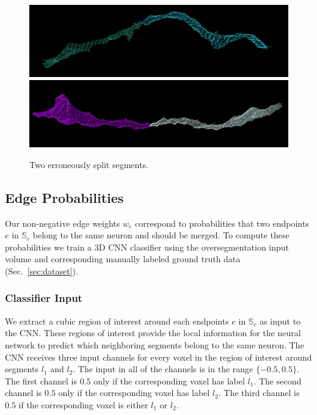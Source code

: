 \begin{figure}[t]
	\centering
	\includegraphics[width=0.92\linewidth]{./figures/split_error1.png}
	\includegraphics[width=0.92\linewidth]{./figures/split_error2.png}
	\caption{Two erroneously split segments. }
	\label{fig:merge_candidates}
\end{figure}

\subsection{Edge Probabilities}

Our non-negative edge weights $w_e$ correspond to probabilities that two endpoints $e$ in $\mathbb{S}_c$ belong to the same neuron and should be merged.  To compute these probabilities we train a 3D CNN classifier using the oversegmentation input volume and corresponding manually labeled ground truth data (Sec.~\ref{sec:dataset}).

\subsubsection{Classifier Input}

We extract a cubic region of interest around each endpoints $e$ in $\mathbb{S}_c$ as input to the CNN. These regions of interest provide the local information for the neural network to predict which neighboring segments belong to the same neuron. The CNN receives three input channels for every voxel in the region of interest around segments $l_1$ and $l_2$. The input in all of the channels is in the range $\{-0.5, 0.5\}$. The first channel is $0.5$ only if the corresponding voxel has label $l_1$. The second channel is $0.5$ only if the corresponding voxel has label $l_2$. The third channel is $0.5$ if the corresponding voxel is either $l_1$ or $l_2$.

